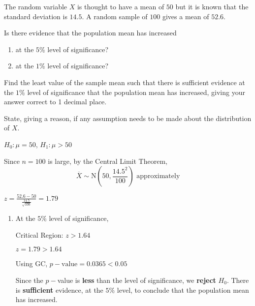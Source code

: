 \documentclass[11pt,a4paper]{book}
\begin{document}
\begin{example}

The random variable $X$ is thought to have a mean of $50$ but it
is known that the standard deviation is $14.5$. A random sample of
$100$ gives a mean of $52.6$.

Is there evidence that the population mean has increased

\begin{enumerate}[label=(\alph*)]

\item  at the $5\%$ level of significance?

\item  at the $1\%$ level of significance?

\end{enumerate}

Find the least value of the sample mean such that there is sufficient
evidence at the $1\%$ level of significance that the population mean
has increased, giving your answer correct to 1 decimal place.

State, giving a reason, if any assumption needs to be made about the
distribution of $X$.

\Solution

$H_{0}:\mu=50$, $H_{1}:\mu>50$

Since $n=100$ is large, by the Central Limit Theorem,
\[
\overline{X}\sim\text{N}\left(50,\frac{14.5^{2}}{100}\right)\text{ approximately}
\]

${\displaystyle z=\frac{52.6-50}{\frac{14.5}{\sqrt{100}}}=1.79}$

\begin{enumerate}[label=(\alph*)]

\item  At the $5\%$ level of significance,

Critical Region: $z>1.64$

$z=1.79>1.64$

Using GC, $p-\text{value}=0.0365<0.05$

\begin{tcolorbox}[colback=white, colframe=black,boxrule=.4pt, sharpish corners]

Since the $p-$value is \textbf{less} than the level of significance,
we \textbf{reject} $H_{0}$. There is \textbf{sufficient} evidence,
at the $5\%$ level, to conclude that the population mean has increased.
\end{tcolorbox}


\end{enumerate}
\end{example}
\end{document}
